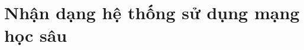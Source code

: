 \clearpage
{}

\setcounter{chapter}{2}
\chapter[NHẬN DẠNG HỆ THỐNG SỬ DỤNG MẠNG HỌC SÂU]{Nhận dạng hệ thống sử dụng mạng học sâu}
\label{sec:ML}


    

    
    

